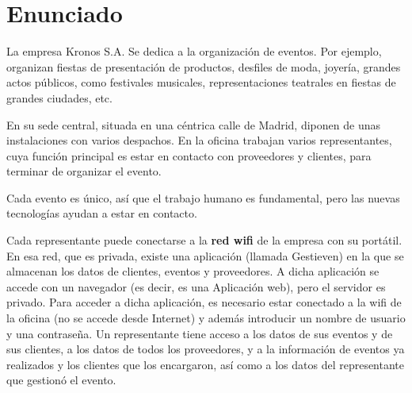 
\usepackage{eurosym}


\newcommand{\nombreprogramaeventos}{Gestieven}
\newcommand{\nombreempresa}{Kronos}
\renewcommand{\hmwkTitle}{Análisis de riesgos \nombreempresa}

\renewcommand{\hmwkClass}{Seguridad informática}

\usepackage{blindtext}






\primerapagina

\setlength{\parindent}{2em}
\setlength{\parskip}{1em}


\section{Enunciado}

La empresa {\nombreempresa} S.A. Se dedica a la organización de eventos. Por ejemplo, organizan fiestas de presentación de productos, desfiles de moda, joyería, grandes actos públicos, como festivales musicales, representaciones teatrales en fiestas de grandes ciudades, etc.

En su sede central, situada en una céntrica calle de Madrid, diponen de unas instalaciones con varios despachos. En la oficina trabajan varios representantes, cuya función principal es estar en contacto con proveedores y clientes, para terminar de organizar el evento.

Cada evento es único, así que el trabajo humano es fundamental, pero las nuevas tecnologías ayudan a estar en contacto.

Cada representante puede conectarse a la \textbf{red wifi} de la empresa con su portátil. En esa red, que es privada, existe una aplicación (llamada {\nombreprogramaeventos}) en la que se almacenan los datos de clientes, eventos y proveedores. A dicha aplicación se accede con un navegador (es decir, es una Aplicación web), pero el servidor es privado.
Para acceder a dicha aplicación, es necesario estar conectado a la wifi de la oficina (no se accede desde Internet) y además introducir un nombre de usuario y una contraseña. Un representante tiene acceso a los datos de sus eventos y de sus clientes, a los datos de todos los proveedores, y a la información de eventos ya realizados y los clientes que los encargaron, así como a los datos del representante que gestionó el evento.

